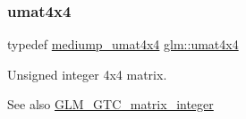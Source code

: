 \subsubsection{\texorpdfstring{umat4x4}{umat4x4}}
{\footnotesize\ttfamily typedef \hyperlink{group__gtc__matrix__integer_ga0dcca70aa643639489cf52acf7574e6c}{mediump\+\_\+umat4x4} \hyperlink{group__gtc__matrix__integer_gae0931b79e808fb0983848778a60eb548}{glm\+::umat4x4}}

Unsigned integer 4x4 matrix. \begin{DoxySeeAlso}{See also}
\hyperlink{group__gtc__matrix__integer}{G\+L\+M\+\_\+\+G\+T\+C\+\_\+matrix\+\_\+integer} 
\end{DoxySeeAlso}
